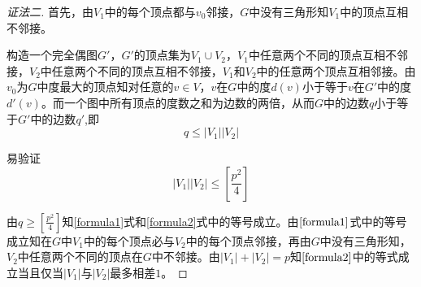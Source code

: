 \documentclass{article}
\begin{document}
\begin{CJK}{UTF8}{gbsn}
\begin{proof}[证法二]
  首先，由$V_1$中的每个顶点都与$v_0$邻接，$G$中没有三角形知$V_1$中的顶点互相不邻接。

  构造一个完全偶图$G'$，$G'$的顶点集为$V_1\cup V_2$，$V_1$中任意两个不同的顶点互相不邻接，$V_2$中任意两个不同的顶点互相不邻接，$V_1$和$V_2$中的任意两个顶点互相邻接。由$v_0$为$G$中度最大的顶点知对任意的$v\in V$，$v$在$G$中的度$d(v)$小于等于$v$在$G'$中的度$d'(v)$。而一个图中所有顶点的度数之和为边数的两倍，从而$G$中的边数$q$小于等于$G'$中的边数$q'$,即
  \begin{equation}\label{formula1}
    q \leq |V_1||V_2|
  \end{equation}

  易验证
  \begin{equation}\label{formula2}
    |V_1||V_2| \leq [\frac{p^2}{4}]
  \end{equation}

  由$q\geq [\frac{p^2}{4}]$知\eqref{formula1}式和\eqref{formula2}式中的等号成立。由$\eqref{formula1}$式中的等号成立知在$G$中$V_1$中的每个顶点必与$V_2$中的每个顶点邻接，再由$G$中没有三角形知，$V_2$中任意两个不同的顶点在$G$中不邻接。由$|V_1|+|V_2|=p$知$\eqref{formula2}$中的等式成立当且仅当$|V_1|$与$|V_2|$最多相差$1$。
\end{proof}
\end{CJK}
\end{document}
